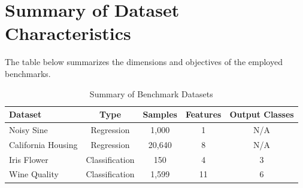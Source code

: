 \section{Summary of Dataset Characteristics}

The table below summarizes the dimensions and objectives of the employed benchmarks.

\begin{table}[htbp]
\centering
\caption{Summary of Benchmark Datasets}
\label{tab:dataset_summary}
\begin{tabular}{lcccc}
\hline
\textbf{Dataset} & \textbf{Type} & \textbf{Samples} & \textbf{Features} & \textbf{Output Classes} \\ \hline
Noisy Sine & Regression & 1,000 & 1 & N/A \\
California Housing & Regression & 20,640 & 8 & N/A \\
Iris Flower & Classification & 150 & 4 & 3 \\
Wine Quality & Classification & 1,599 & 11 & 6 \\ \hline
\end{tabular}
\end{table}